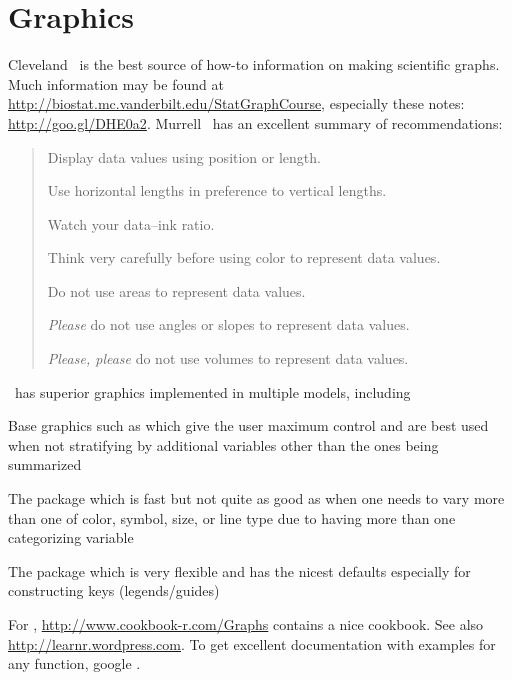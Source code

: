 \section{Graphics} 
Cleveland~\cite{cle94ele,cle84sci} is the best source of how-to
information on making scientific graphs.  Much information may be
found at \url{http://biostat.mc.vanderbilt.edu/StatGraphCourse},
especially these notes: \url{http://goo.gl/DHE0a2}.
Murrell~\cite{mur13inf} has an excellent summary of recommendations:
\begin{quote}
\bi
\item Display data values using position or length.
\item Use horizontal lengths in preference to vertical lengths.
\item Watch your data--ink ratio.
\item Think very carefully before using color to represent data
  values.
\item Do not use areas to represent data values.
\item \emph{Please} do not use angles or slopes to represent data
  values.
\item \emph{Please, please} do not use volumes to represent data
  values.
\ei
\end{quote}

\R\ has superior graphics implemented in multiple models, including
\bi
\item Base graphics such as 
  which give the user maximum control and are best used when not
  stratifying by additional variables other than the ones being summarized
\item The  package which is fast but not quite as good as
   when one needs to vary more than one of color, symbol,
  size, or line type due to having more than one categorizing variable
\item The  package which is very flexible and has the
  nicest defaults especially for constructing keys (legends/guides)
\ei

For , \url{http://www.cookbook-r.com/Graphs} contains a
nice cookbook.  See also \url{http://learnr.wordpress.com}.  To get
excellent documentation with examples for any 
 function, google .


